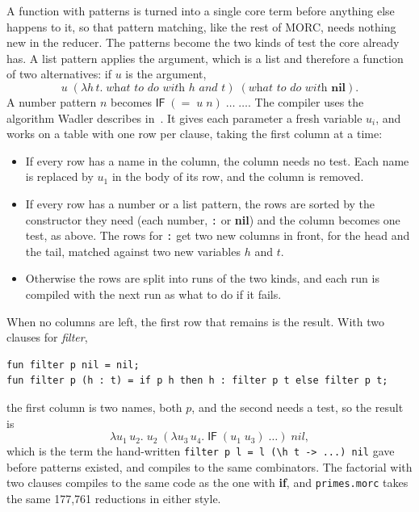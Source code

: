 \documentclass[11pt,a4paper]{article}
\newcommand{\cmb}[1]{\textsf{#1}}
\newcommand{\IF}{\cmb{IF}}
\theoremstyle{definition}
\theoremstyle{plain}
\newcommand{\kw}[1]{\textbf{#1}}
\begin{document}
A function with patterns is turned into a single core term before anything
else happens to it, so that pattern matching, like the rest of MORC, needs
nothing new in the reducer. The patterns become the two kinds of test the
core already has. A list pattern applies the argument, which is a list and
therefore a function of two alternatives: if $u$ is the argument,
\[
  u\;(\lambda h\,t.\;\textit{what to do with } h \textit{ and } t)\;
     (\textit{what to do with } \kw{nil}).
\]
A number pattern $n$ becomes $\IF\;({=}\;u\;n)\;\ldots\;\ldots$. The compiler
uses the algorithm Wadler describes in~\cite[ch.~5]{pj87}. It gives each parameter a fresh variable $u_i$, and works on a table with
one row per clause, taking the first column at a time:
\begin{itemize}[itemsep=2pt]
\item If every row has a name in the column, the column needs no test. Each
  name is replaced by $u_1$ in the body of its row, and the column is
  removed.
\item If every row has a number or a list pattern, the rows are sorted by
  the constructor they need (each number, \verb|:| or \kw{nil}) and the
  column becomes one test, as above. The rows for \verb|:| get two new
  columns in front, for the head and the tail, matched against two new
  variables $h$ and $t$.
\item Otherwise the rows are split into runs of the two kinds, and each run
  is compiled with the next run as what to do if it fails.
\end{itemize}
When no columns are left, the first row that remains is the result. With
two clauses for \textit{filter},
\begin{lstlisting}[style=morc]
fun filter p nil = nil;
fun filter p (h : t) = if p h then h : filter p t else filter p t;
\end{lstlisting}
the first column is two names, both $p$, and the second needs a test, so the
result is
\[
  \lambda u_1\,u_2.\;u_2\;(\lambda u_3\,u_4.\;\IF\;(u_1\;u_3)\;\ldots)\;\mathit{nil},
\]
which is the term the hand-written \verb|filter p l = l (\h t -> ...) nil|
gave before patterns existed, and compiles to the same combinators. The
factorial with two clauses compiles to the same code as the one with
\kw{if}, and \texttt{primes.morc} takes the same 177,761 reductions in
either style.
\end{document}
